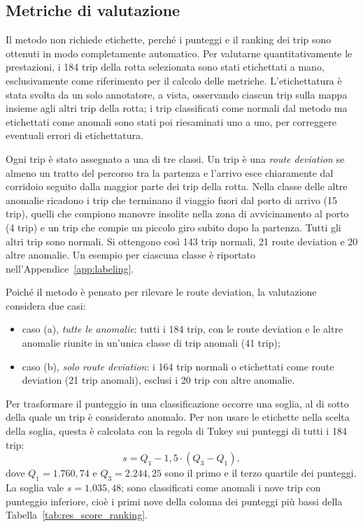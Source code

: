 \subsection{Metriche di valutazione}\label{ssec:res_metrics}

Il metodo non richiede etichette, perché i punteggi e il ranking dei trip sono ottenuti in modo
completamente automatico. Per valutarne quantitativamente le prestazioni, i 184 trip della
rotta selezionata sono stati etichettati a mano, esclusivamente come riferimento per il calcolo
delle metriche. L'etichettatura è stata svolta da un solo annotatore, a vista, osservando
ciascun trip sulla mappa insieme agli altri trip della rotta; i trip classificati come normali
dal metodo ma etichettati come anomali sono stati poi riesaminati uno a uno, per correggere
eventuali errori di etichettatura.

Ogni trip è stato assegnato a una di tre classi. Un trip è una \emph{route deviation} se almeno
un tratto del percorso tra la partenza e l'arrivo esce chiaramente dal corridoio seguito dalla
maggior parte dei trip della rotta. Nella classe delle altre anomalie ricadono i trip che
terminano il viaggio fuori dal porto di arrivo (15 trip), quelli che compiono manovre insolite
nella zona di avvicinamento al porto (4 trip) e un trip che compie un piccolo giro subito dopo la
partenza. Tutti gli altri trip sono normali. Si ottengono così 143 trip normali, 21 route
deviation e 20 altre anomalie.
Un esempio per ciascuna classe è riportato nell'Appendice~\ref{app:labeling}.

Poiché il metodo è pensato per rilevare le route deviation, la valutazione considera due casi:
\begin{itemize}
    \item caso (a), \emph{tutte le anomalie}: tutti i 184 trip, con le route deviation e le
    altre anomalie riunite in un'unica classe di trip anomali (41 trip);
    \item caso (b), \emph{solo route deviation}: i 164 trip normali o etichettati come route
    deviation (21 trip anomali), esclusi i 20 trip con altre anomalie.
\end{itemize}

Per trasformare il punteggio in una classificazione occorre una soglia, al di sotto della quale
un trip è considerato anomalo. Per non usare le etichette nella scelta della soglia, questa è
calcolata con la regola di Tukey sui punteggi di tutti i 184 trip:
\begin{equation}
    s = Q_1 - 1{,}5 \cdot (Q_3 - Q_1),
\end{equation}
dove $Q_1 = 1.760{,}74$ e $Q_3 = 2.244{,}25$ sono il primo e il terzo quartile dei punteggi.
La soglia vale $s = 1.035{,}48$; sono classificati come anomali i nove trip con punteggio
inferiore, cioè i primi nove della colonna dei punteggi più bassi della
Tabella~\ref{tab:res_score_ranking}.

